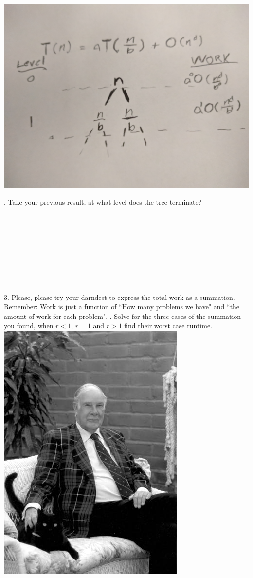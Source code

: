 \documentclass[12pt]{article}
\begin{document}
\centerline{\includegraphics[scale = 0.05]{tree.jpg}} 
\newpage
{}. Take your previous result, at what level does the tree terminate?\\\\\\\\\\\\\\\\\\\\
3. Please, please try your darndest to express the total work as a summation. Remember: Work is just a function of ``How many problems we have" and ``the amount of work for each problem".
\newpage
{}. Solve for the three cases of the summation you found, when $r<1$, $r=1$ and $r>1$ find their worst case runtime. 
\newpage
\noindent \includegraphics[scale = 0.2]{hamming_cat.jpg}\\
\end{document}
